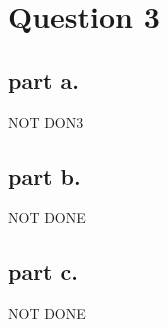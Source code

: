 \section{Question 3}

\subsection{part a.}
NOT DON3

\subsection{part b.}
NOT DONE

\subsection{part c.}
NOT DONE
